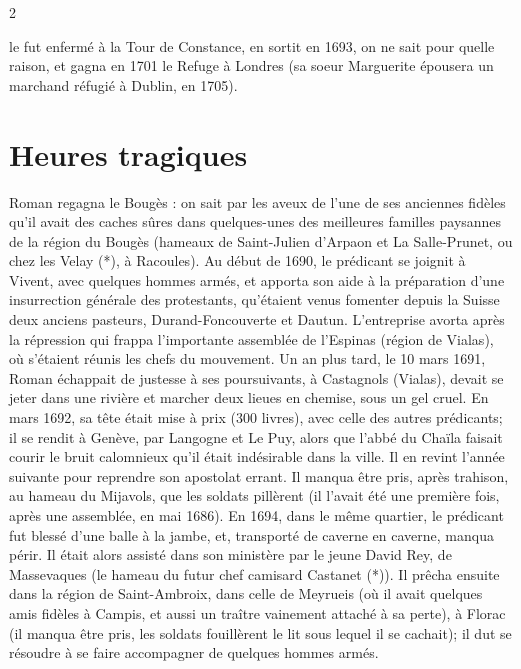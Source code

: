 

{\fontsize{9.65}{11.05}\selectfont
\begin{multicols}{2}

le fut enfermé à la Tour de Constance, en sortit en 1693, on ne sait pour quelle raison, et gagna en 1701 le Refuge à Londres (sa soeur Marguerite épousera un marchand réfugié à Dublin, en 1705).

\section*{Heures tragiques}

Roman regagna le Bougès : on sait par les aveux de l’une de ses anciennes fidèles qu’il avait des caches sûres dans quelques-unes des meilleures familles paysannes de la région du Bougès (hameaux de Saint-Julien d’Arpaon et La Salle-Prunet, ou chez les Velay (*), à Racoules). Au début de 1690, le prédicant se joignit à Vivent, avec quelques hommes armés, et apporta son aide à la préparation d’une insurrection générale des protestants, qu’étaient venus fomenter depuis la Suisse deux anciens pasteurs, Durand-Foncouverte et Dautun. L’entreprise avorta après la répression qui frappa l’importante assemblée de l’Espinas (région de Vialas), où s’étaient réunis les chefs du mouvement. Un an plus tard, le 10 mars 1691, Roman échappait de justesse à ses poursuivants, à Castagnols (Vialas), devait se jeter dans une rivière et marcher deux lieues en chemise, sous un gel cruel. En mars 1692, sa tête était mise à prix (300 livres), avec celle des autres prédicants; il se rendit à Genève, par Langogne et Le Puy, alors que l’abbé du Chaïla faisait courir le bruit calomnieux qu’il était indésirable dans la ville. Il en revint l’année suivante pour reprendre son apostolat errant. Il manqua être pris, après trahison, au hameau du Mijavols, que les soldats pillèrent (il l’avait été une première fois, après une assemblée, en mai 1686). En 1694, dans le même quartier, le prédicant fut blessé d’une balle à la jambe, et, transporté de caverne en caverne, manqua périr. Il était alors assisté dans son ministère par le jeune David Rey, de Massevaques (le hameau du futur chef camisard Castanet (*)). Il prêcha ensuite dans la région de Saint-Ambroix, dans celle de Meyrueis (où il avait quelques amis fidèles à Campis, et aussi un traître vainement attaché à sa perte), à Florac (il manqua être pris, les soldats fouillèrent le lit sous lequel il se cachait); il dut se résoudre à se faire accompagner de quelques hommes armés.


\end{multicols}}
